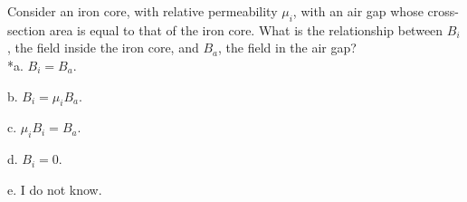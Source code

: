 
Consider an iron core, with relative permeability
\(\mu_i\), with an air gap whose cross-section area is equal to that of the iron
core. What is the relationship between \(B_i\), the field
inside the iron core, and \(B_a\), the field in the air gap? \\

*a. \( B_i = B_a \).

b. \( B_i = \mu_i B_a \).

c. \( \mu_i B_i = B_a \).

d. \( B_i = 0 \).

e. I do not know.\\
